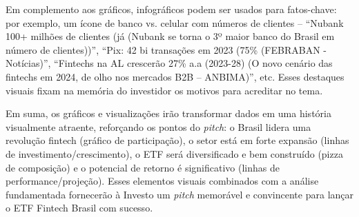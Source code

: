 \documentclass[12pt]{article}
\begin{document}
Em complemento aos gráficos, infográficos podem ser usados para fatos-chave: por exemplo, um ícone de banco vs. celular com números de clientes – “Nubank 100+ milhões de clientes (já (Nubank se torna o 3º maior banco do Brasil em número de clientes))”, “Pix: 42 bi transações em 2023 (75\% (FEBRABAN - Notícias)”, “Fintechs na AL crescerão 27\% a.a (2023-28) (O novo cenário das fintechs em 2024, de olho nos mercados B2B – ANBIMA)”, etc. Esses destaques visuais fixam na memória do investidor os motivos para acreditar no tema.

Em suma, os gráficos e visualizações irão transformar dados em uma história visualmente atraente, reforçando os pontos do \textit{pitch}: o Brasil lidera uma revolução fintech (gráfico de participação), o setor está em forte expansão (linhas de investimento/crescimento), o ETF será diversificado e bem construído (pizza de composição) e o potencial de retorno é significativo (linhas de performance/projeção). Esses elementos visuais combinados com a análise fundamentada fornecerão à Investo um \textit{pitch} memorável e convincente para lançar o ETF Fintech Brasil com sucesso.
\end{document}

